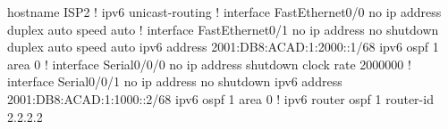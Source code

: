 hostname ISP2
!
ipv6 unicast-routing
!
interface FastEthernet0/0
 no ip address
 duplex auto
 speed auto
!
interface FastEthernet0/1
 no ip address
 no shutdown
 duplex auto
 speed auto
 ipv6 address 2001:DB8:ACAD:1:2000::1/68
 ipv6 ospf 1 area 0
!
interface Serial0/0/0
 no ip address
 shutdown
 clock rate 2000000
!
interface Serial0/0/1
 no ip address
 no shutdown
 ipv6 address 2001:DB8:ACAD:1:1000::2/68
 ipv6 ospf 1 area 0
!
ipv6 router ospf 1
 router-id 2.2.2.2

